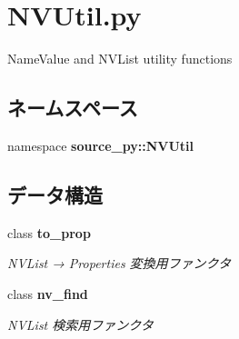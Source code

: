 \section{NVUtil.py}
\label{_n_v_util_8py}
NameValue and NVList utility functions 

\subsection*{ネームスペース}
\begin{CompactItemize}
\item 
namespace \textbf{source\_\-py::NVUtil}
\end{CompactItemize}
\subsection*{データ構造}
\begin{CompactItemize}
\item 
class {\bf to\_\-prop}
\begin{CompactList}\small\item\em NVList → Properties 変換用ファンクタ \item\end{CompactList}\item 
class {\bf nv\_\-find}
\begin{CompactList}\small\item\em NVList 検索用ファンクタ \item\end{CompactList}\end{CompactItemize}
